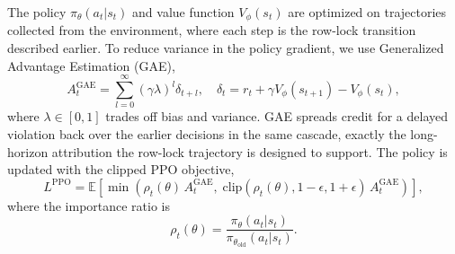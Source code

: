 \documentclass[sigconf]{acmart}
\begin{document}
The policy $\pi_\theta(a_t|s_t)$ and value function $V_\phi(s_t)$ are optimized on trajectories collected from the environment, where each step is the row-lock transition described earlier. To reduce variance in the policy gradient, we use Generalized Advantage Estimation (GAE),
\[
A_t^{\text{GAE}} =
\sum_{l=0}^{\infty} (\gamma \lambda)^l \delta_{t+l},
\quad
\delta_t = r_t + \gamma V_\phi(s_{t+1}) - V_\phi(s_t),
\]
where $\lambda \in [0,1]$ trades off bias and variance. GAE spreads credit for a delayed violation back over the earlier decisions in the same cascade, exactly the long-horizon attribution the row-lock trajectory is designed to support. The policy is updated with the clipped PPO objective,
\begin{equation}
L^{\text{PPO}} =
\mathbb{E}\!\left[
\min\!\left(
\rho_t(\theta)\, A_t^{\text{GAE}},\;
\text{clip}(\rho_t(\theta), 1-\epsilon, 1+\epsilon)\, A_t^{\text{GAE}}
\right)
\right],
\end{equation}
where the importance ratio is
\begin{equation}
\rho_t(\theta) = \frac{\pi_\theta(a_t|s_t)}{\pi_{\theta_{\text{old}}}(a_t|s_t)}.
\end{equation}
\end{document}
